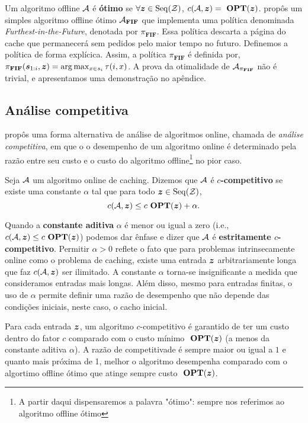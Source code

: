 Um algoritmo offline \(\mathcal{A}\) é \textbf{ótimo} se \(\forall \bm{z} \in \operatorname{Seq}(\mathcal{Z})\), \(c(\mathcal{A}, \bm{z}) = \ \textbf{OPT}(\bm{z})\). \textcite{Belady66} propôs um simples algoritmo offline ótimo \(\mathcal{A}_{\bold{FIF}}\) que implementa uma política denominada \textit{Furthest-in-the-Future}, denotada por \(\pi_{\mathbf{FIF}}\). Essa política descarta a página do cache que permanecerá sem pedidos pelo maior tempo no futuro. Definemos a política de forma explícica. 
Assim, a política \( \pi_{\mathbf{FIF}} \) é definida por, \( \pi_{\mathbf{FIF}} (\bm{s}_{1:i}, \bm{z}) = \arg {\max_{x \in s_i} \tau(i, x)}\). A prova da otimalidade de \(\mathcal{A}_{\pi_{\mathbf{FIF}}}\) não é trivial, e apresentamos uma demonstração no apêndice.

\subsection{Análise competitiva}

\textcite{Sleator93} propôs uma forma alternativa de análise de algoritmos online, chamada de \emph{análise competitiva}, em que o o desempenho de um algoritmo online é determinado pela razão entre seu custo e o custo do algoritmo offline\footnote{A partir daqui dispensaremos a palavra "ótimo": sempre nos referimos ao algoritmo offline ótimo} no pior caso.
\begin{definition}
  \label{def:comp}
  Seja \(\mathcal{A}\) um algoritmo online de caching. Dizemos que \(\mathcal{A}\) é \(c\)\textbf{-competitivo} se existe uma constante \(\alpha\) tal que para todo \(\bm{z} \in \operatorname{Seq}(\mathcal{Z})\),
\begin{equation}
  c(\mathcal{A}, \bm{z} ) \le c \ \textbf{OPT}(\bm{z}) + \alpha.
\end{equation}
\end{definition}

Quando a \textbf{constante aditiva} \(\alpha\) é menor ou igual a zero (i.e., \(c(\mathcal{A}, \bm{z}) \le c \ \textbf{OPT}(\bm{z})\)) podemos dar ênfase e dizer que \(\mathcal{A}\) é \textbf{estritamente \(c\)-competitivo}. Permitir \(\alpha > 0\) reflete o fato que para problemas intrinsecamente online como o problema de caching, existe uma entrada \(\bm{z}\) arbitrariamente longa que faz \(c(\mathcal{A}, \bm{z})\) ser ilimitado. A constante \(\alpha\) torna-se insignificante a medida que consideramos entradas mais longas. Além disso, mesmo para entradas finitas, o uso de \(\alpha\) permite definir uma razão de desempenho que não depende das condições iniciais, neste caso, o cacho inicial. 

Para cada entrada \(\bm{z}\), um algoritmo \(c\)-competitivo é garantido de ter um custo dentro do fator \(c\) comparado com o custo mínimo \(\ \textbf{OPT}(\bm{z})\) (a menos da constante aditiva \(\alpha\)). A razão de competitivade é sempre maior ou igual a \(1\) e quanto mais próxima de 1, melhor o algoritmo desempenha comparado com o algortimo offline ótimo que atinge sempre custo \(\ \textbf{OPT}(\bm{z})\).

